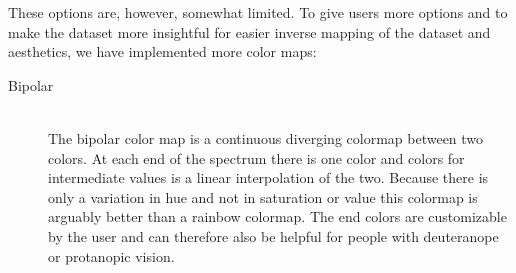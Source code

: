 		\clearpage
		These options are, however, somewhat limited. 
		To give users more options and to make the dataset more insightful for easier inverse mapping of the dataset and aesthetics, we have implemented more color maps:
		\begin{description}
			\item[Bipolar] ~\\
			The bipolar color map is a continuous diverging colormap between two colors. 
			At each end of the spectrum there is one color and colors for intermediate values is a linear interpolation of the two. 
			Because there is only a variation in hue and not in saturation or value this colormap is arguably better than a rainbow colormap.
			The end colors are customizable by the user and can therefore also be helpful for people with deuteranope or protanopic vision.\cite{moreland2009diverging}
			\begin{figure}[htb]
			  \centering

\end{figure}
\end{description}
